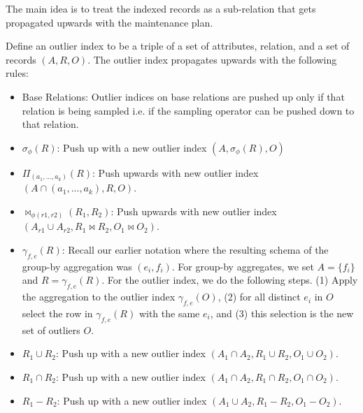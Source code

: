 The main idea is to treat the indexed records as a sub-relation that gets propagated upwards with the maintenance plan.
\begin{definition}
Define an outlier index to be a triple of a set of attributes, relation, and a set of records $(A,R,O)$. The outlier index propagates upwards with the following rules: 
\begin{itemize}\vspace{-.45em}
\item Base Relations: Outlier indices on base relations are pushed up only if that relation is being sampled i.e. if the sampling operator can be pushed down to that relation.\vspace{-.45em}
\item $\sigma_{\phi}(R)$: Push up with a new outlier index $(A,\sigma_{\phi}(R),O)$ \vspace{-.45em}
\item $\Pi_{(a_1,...,a_k)}(R)$: Push upwards with new outlier index $(A \cap (a_1,...,a_k), R,O)$.\vspace{-.45em}
\item $\bowtie_{\phi (r1,r2)}(R_1,R_2)$: Push upwards with new outlier index $(A_{r1} \cup A_{r2}, R_1 \bowtie R_2 ,O_1 \bowtie O_2)$. 
\item $\gamma_{f,e}(R)$: Recall our earlier notation where the resulting schema of the group-by aggregation was $(e_i,f_i)$. For group-by aggregates, we set $A = \{f_i\}$ and $R = \gamma_{f,e}(R)$. For the outlier index, we do the following steps. (1) Apply the aggregation to the outlier index $\gamma_{f,e}(O)$, (2) for all distinct $e_i$ in $O$ select the row in $\gamma_{f,e}(R)$ with the same $e_i$, and (3) this selection is the new set of outliers $O$. 
\item $R_1 \cup R_2$: Push up with a new outlier index $(A_1 \cap A_2 ,R_1 \cup R_2,O_1 \cup O_2)$. 
\item $R_1 \cap R_2$: Push up with a new outlier index $(A_1 \cap A_2 ,R_1 \cap R_2,O_1 \cap O_2)$.
\item $R_1 - R_2$: Push up with a new outlier index $(A_1 \cup A_2 ,R_1 - R_2,O_1 - O_2)$.
\end{itemize}
\end{definition}

